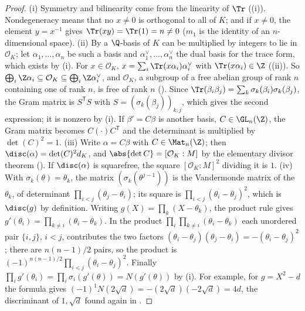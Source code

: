 \begin{proof}
(i) Symmetry and bilinearity come from the linearity of $\Tr$ ((i)). Nondegeneracy means that no $x\ne0$ is orthogonal to
all of $K$; and if $x\ne0$, the element $y=x^{-1}$ gives $\Tr(xy)=\Tr(1)=n\ne0$ ($m_1$ is the identity of an $n$-dimensional space). (ii) By  a $\Q$-basis of $K$ can be multiplied by integers to lie in
$\mathcal O_K$; let $\alpha_1,\dots,\alpha_n$ be such a basis and $\alpha_1^\vee,\dots,\alpha_n^\vee$ the dual basis for the trace form, which exists
by (i). For $x\in\mathcal O_K$, $x=\sum_i\Tr(x\alpha_i)\alpha_i^\vee$ with $\Tr(x\alpha_i)\in\Z$ ((ii)). So
$\bigoplus_i\Z\alpha_i\subseteq\mathcal O_K\subseteq\bigoplus_i\Z\alpha_i^\vee$, and $\mathcal O_K$, a subgroup of a free abelian group of rank $n$
containing one of rank $n$, is free of rank $n$ (). Since $\Tr(\beta_i\beta_j)=\sum_k\sigma_k(\beta_i)\sigma_k(\beta_j)$, the Gram matrix is
$S^{\mathsf T}S$ with $S=(\sigma_k(\beta_j))_{k,j}$, which gives the second expression; it is nonzero by (i). If $\beta'=C\beta$ is another basis,
$C\in\GL_n(\Z)$, the Gram matrix becomes $C(\cdot)C^{\mathsf T}$ and the determinant is multiplied by $\det(C)^2=1$.
(iii) Write $\alpha=C\beta$ with $C\in\Mat_n(\Z)$; then $\disc(\alpha)=\det(C)^2d_K$, and $\abs{\det C}=[\mathcal O_K:M]$ by the elementary
divisor theorem (). If $\disc(\alpha)$ is squarefree, the square $[\mathcal O_K:M]^2$ dividing it is $1$.
(iv) With $\sigma_k(\theta)=\theta_k$, the matrix $(\sigma_k(\theta^{j-1}))$ is the Vandermonde matrix of the $\theta_k$, of determinant
$\prod_{i<j}(\theta_j-\theta_i)$; its square is $\prod_{i<j}(\theta_i-\theta_j)^2$, which is $\disc(g)$ by definition. Writing $g(X)=\prod_k(X-\theta_k)$, the
product rule gives $g'(\theta_i)=\prod_{k\ne i}(\theta_i-\theta_k)$. In the product $\prod_i\prod_{k\ne i}(\theta_i-\theta_k)$ each unordered pair $\{i,j\}$, $i<j$,
contributes the two factors $(\theta_i-\theta_j)(\theta_j-\theta_i)=-(\theta_i-\theta_j)^2$; there are $n(n-1)/2$ pairs, so the product is
$(-1)^{n(n-1)/2}\prod_{i<j}(\theta_i-\theta_j)^2$. Finally $\prod_ig'(\theta_i)=\prod_i\sigma_i(g'(\theta))=N(g'(\theta))$ by (i). For example, for
$g=X^2-d$ the formula gives $(-1)^1N(2\sqrt d)=-(2\sqrt d)(-2\sqrt d)=4d$, the discriminant of $1,\sqrt d$ found again in .
\end{proof}

